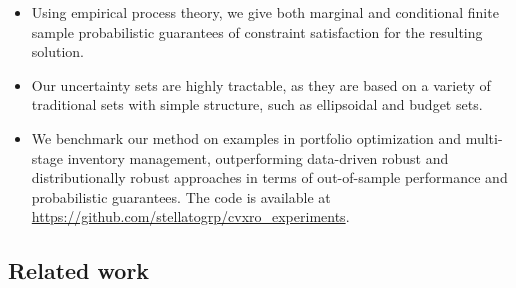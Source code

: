 \documentclass[11pt]{article}
\newcommand{\githubrepo}{\url{https://github.com/stellatogrp/cvxro_experiments}}
\newcommand{\bsnote}[1]{\noindent\textcolor{red}{\texttt{Bartolomeo: #1}}}
\begin{document}
\begin{itemize}
 \item Using empirical process theory, we give both marginal and conditional finite sample probabilistic guarantees of constraint satisfaction for the resulting solution.
 \item Our uncertainty sets are highly tractable, as they are based on 
a variety of traditional sets with simple structure, such as ellipsoidal and budget sets. 
\item We benchmark our method on examples in portfolio optimization and multi-stage inventory management, outperforming data-driven robust and distributionally robust approaches in terms of out-of-sample performance and probabilistic guarantees. The code is available at \githubrepo.
\end{itemize}

\subsection{Related work}%
\label{sub:related_work}
\end{document}
